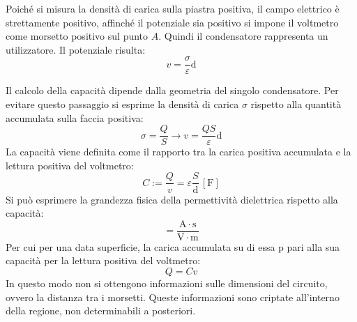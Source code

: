 \documentclass{article}
\newcommand{\df}{\mathrm{d}}
\newcommand{\SI}[1]{\mathrm{#1}}
\numberwithin{equation}{subsection}
\begin{document}
Poiché si misura la densità di carica sulla piastra positiva, il campo elettrico è strettamente positivo, affinché il potenziale sia positivo si impone il voltmetro come 
morsetto positivo sul punto $A$. Quindi il condensatore rappresenta un utilizzatore. Il potenziale risulta:
\begin{equation*}
    v=\displaystyle\frac{\sigma}{\varepsilon}\df
\end{equation*}

Il calcolo della capacità dipende dalla geometria del singolo condensatore. Per evitare questo passaggio si esprime la densità di carica $\sigma$ rispetto alla quantità 
accumulata sulla faccia positiva:
\begin{equation*}
    \sigma=\displaystyle\frac{Q}{S}\to v=\frac{QS}{\varepsilon}\df
\end{equation*}
La capacità viene definita come il rapporto tra la carica positiva accumulata e la lettura positiva del voltmetro:
\begin{equation}
    C:=\displaystyle\frac{Q}{v}=\varepsilon\frac{S}{\df}\,[\SI{F}]
\end{equation}
Si può esprimere la grandezza fisica della permettività dielettrica rispetto alla capacità:
\begin{equation*}
    [\varepsilon]=\displaystyle\frac{\SI{A}\cdot \SI{s}}{\SI{V}\cdot \SI{m}}
\end{equation*} 
Per cui per una data superficie, la carica accumulata su di essa p pari alla sua capacità per la lettura positiva del voltmetro:
\begin{equation*}
    Q=Cv
\end{equation*}
In questo modo non si ottengono informazioni sulle dimensioni del circuito, ovvero la distanza tra i morsetti. Queste informazioni sono criptate all'interno della regione, 
non determinabili a posteriori. 
\end{document}
